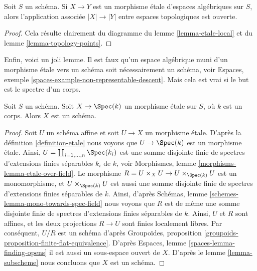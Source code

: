 \begin{lemma}
\label{lemma-etale-open}
Soit $S$ un schéma.
Si $X \to Y$ est un morphisme \'etale d'espaces algébriques sur $S$,
alors l'application associée $|X| \to |Y|$ entre espaces topologiques
est ouverte.
\end{lemma}

\begin{proof}
Cela résulte clairement du diagramme du
lemme \ref{lemma-etale-local}
et du
lemme \ref{lemma-topology-points}.
\end{proof}

\noindent
Enfin, voici un joli lemme. Il est faux qu'un espace algébrique
muni d'un morphisme \'etale vers un schéma soit nécessairement un schéma, voir
Espaces, exemple \ref{spaces-example-non-representable-descent}.
Mais cela est vrai si le but est le spectre d'un corps.

\begin{lemma}
\label{lemma-etale-over-field-scheme}
Soit $S$ un schéma. Soit $X \to \Spec(k)$
un morphisme \'etale sur $S$, où $k$ est un corps.
Alors $X$ est un schéma.
\end{lemma}

\begin{proof}
Soit $U$ un schéma affine et soit $U \to X$ un morphisme \'etale. D'après la
définition \ref{definition-etale}
nous voyons que $U \to \Spec(k)$ est un morphisme \'etale.
Ainsi, $U = \coprod_{i = 1, \ldots, n} \Spec(k_i)$
est une somme disjointe finie de spectres d'extensions finies séparables
$k_i$ de $k$, voir
Morphismes, lemme \ref{morphisms-lemma-etale-over-field}.
Le morphisme $R = U \times_X U \to U \times_{\Spec(k)} U$ est un monomorphisme,
et $U \times_{\Spec(k)} U$ est aussi une somme disjointe finie de
spectres d'extensions finies séparables de $k$. Ainsi, d'après
Schémas, lemme \ref{schemes-lemma-mono-towards-spec-field}
nous voyons que $R$ est de même une somme disjointe finie de
spectres d'extensions finies séparables de $k$.
Ainsi, $U$ et $R$ sont affines, et
les deux projections $R \to U$ sont finies localement libres.
Par conséquent, $U/R$ est un schéma d'après
Groupoïdes, proposition \ref{groupoids-proposition-finite-flat-equivalence}.
D'après
Espaces, lemme \ref{spaces-lemma-finding-opens}
il est aussi un sous-espace ouvert de $X$. D'après le
lemme \ref{lemma-subscheme}
nous concluons que $X$ est un schéma.
\end{proof}













